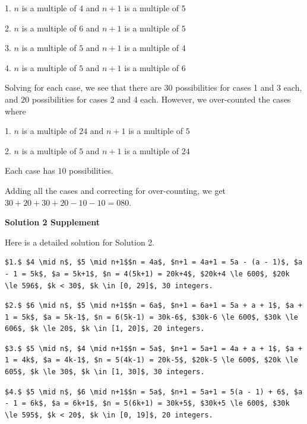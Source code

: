 \begin{enumerate}
 1. $n$ is a multiple of $4$ and $n+1$ is a multiple of $5$

 2. $n$ is a multiple of $6$ and $n+1$ is a multiple of $5$

 3. $n$ is a multiple of $5$ and $n+1$ is a multiple of $4$

 4. $n$ is a multiple of $5$ and $n+1$ is a multiple of $6$

 Solving for each case, we see that there are $30$ possibilities for cases 1 and 3 each, and $20$ possibilities for cases 2 and 4 each. However, we over-counted the cases where 

 1. $n$ is a multiple of $24$ and $n+1$ is a multiple of $5$

 2. $n$ is a multiple of $5$ and $n+1$ is a multiple of $24$

 Each case has $10$ possibilities.

 Adding all the cases and correcting for over-counting, we get $30 + 20 + 30 + 20 - 10 - 10 = \boxed {080}.$




\textbf{Solution 2 Supplement}

Here is a detailed solution for Solution 2.

 \begin{verbatim}
$1.$ $4 \mid n$, $5 \mid n+1$$n = 4a$, $n+1 = 4a+1 = 5a - (a - 1)$, $a - 1 = 5k$, $a = 5k+1$, $n = 4(5k+1) = 20k+4$, $20k+4 \le 600$, $20k \le 596$, $k < 30$, $k \in [0, 29]$, 30 integers.
\end{verbatim}

\begin{verbatim}
$2.$ $6 \mid n$, $5 \mid n+1$$n = 6a$, $n+1 = 6a+1 = 5a + a + 1$, $a + 1 = 5k$, $a = 5k-1$, $n = 6(5k-1) = 30k-6$, $30k-6 \le 600$, $30k \le 606$, $k \le 20$, $k \in [1, 20]$, 20 integers.
\end{verbatim}

\begin{verbatim}
$3.$ $5 \mid n$, $4 \mid n+1$$n = 5a$, $n+1 = 5a+1 = 4a + a + 1$, $a + 1 = 4k$, $a = 4k-1$, $n = 5(4k-1) = 20k-5$, $20k-5 \le 600$, $20k \le 605$, $k \le 30$, $k \in [1, 30]$, 30 integers.
\end{verbatim}

\begin{verbatim}
$4.$ $5 \mid n$, $6 \mid n+1$$n = 5a$, $n+1 = 5a+1 = 5(a - 1) + 6$, $a - 1 = 6k$, $a = 6k+1$, $n = 5(6k+1) = 30k+5$, $30k+5 \le 600$, $30k \le 595$, $k < 20$, $k \in [0, 19]$, 20 integers.
\end{verbatim}


\end{enumerate}
